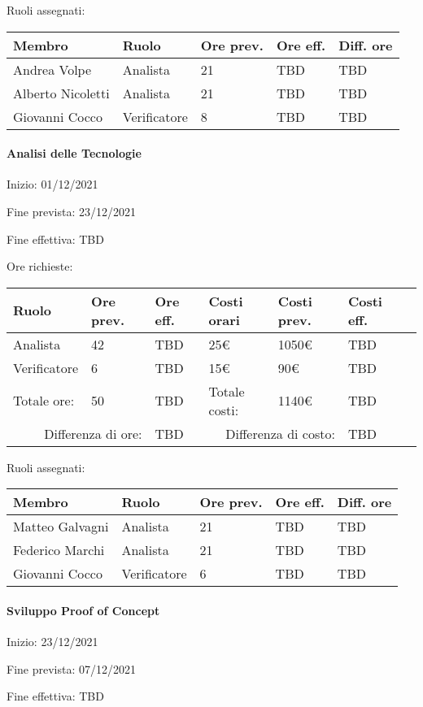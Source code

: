 \documentclass[a4paper, 12pt]{article}
\begin{document}
Ruoli assegnati:\\[0.5em]
\begin{tabular}{|l|l|l|l|l|}\hline
Membro & Ruolo & Ore prev. & Ore eff. & Diff. ore \\\hline
Andrea Volpe & Analista & 21 & TBD & TBD \\\hline
Alberto Nicoletti & Analista & 21 & TBD & TBD \\\hline
Giovanni Cocco & Verificatore & 8 & TBD & TBD \\\hline
\end{tabular}

\paragraph{Analisi delle Tecnologie}
Inizio: 01/12/2021\par
Fine prevista: 23/12/2021\par
Fine effettiva: TBD

Ore richieste:\\[0.5em]
\begin{tabular}{|l|l|l||l|l|l|l|}\hline
Ruolo & Ore prev. & Ore eff. & Costi orari & Costi prev. & Costi eff.\\\hline
Analista & 42 & TBD & 25\euro & 1050\euro & TBD \\\hline
Verificatore & 6 & TBD & 15\euro & 90\euro & TBD \\\hline
Totale ore: & 50 & TBD & Totale costi: & 1140\euro & TBD \\\hline
\multicolumn{2}{|r|}{Differenza di ore:} & TBD & \multicolumn{2}{r|}{Differenza di costo:} & TBD \\\hline
\end{tabular}

Ruoli assegnati:\\[0.5em]
\begin{tabular}{|l|l|l|l|l|}\hline
Membro & Ruolo & Ore prev. & Ore eff. & Diff. ore \\\hline
Matteo Galvagni & Analista & 21 & TBD & TBD \\\hline
Federico Marchi & Analista & 21 & TBD & TBD \\\hline
Giovanni Cocco & Verificatore & 6 & TBD & TBD \\\hline
\end{tabular}

\paragraph{Sviluppo Proof of Concept}
Inizio: 23/12/2021\par
Fine prevista: 07/12/2021\par
Fine effettiva: TBD
\end{document}
